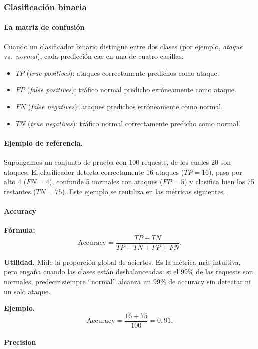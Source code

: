 \documentclass[12pt,oneside]{report}
\begin{document}
\subsubsection{Clasificación binaria}

\paragraph{La matriz de confusión}

Cuando un clasificador binario distingue entre dos clases (por ejemplo,
\emph{ataque} vs.\ \emph{normal}), cada predicción cae en una de cuatro
casillas:
\begin{itemize}[leftmargin=*]
  \item $TP$ (\emph{true positives}): ataques correctamente predichos como ataque.
  \item $FP$ (\emph{false positives}): tráfico normal predicho erróneamente como ataque.
  \item $FN$ (\emph{false negatives}): ataques predichos erróneamente como normal.
  \item $TN$ (\emph{true negatives}): tráfico normal correctamente predicho como normal.
\end{itemize}

\paragraph{Ejemplo de referencia.} Supongamos un conjunto de prueba con
100 requests, de los cuales 20 son ataques. El clasificador detecta
correctamente 16 ataques ($TP=16$), pasa por alto 4 ($FN=4$), confunde 5
normales con ataques ($FP=5$) y clasifica bien los 75 restantes
($TN=75$). Este ejemplo se reutiliza en las métricas siguientes.

\paragraph{Accuracy}

\textbf{Fórmula:}
\[
\mathrm{Accuracy}=\frac{TP+TN}{TP+TN+FP+FN}.
\]

\textbf{Utilidad.} Mide la proporción global de aciertos. Es la métrica
más intuitiva, pero engaña cuando las clases están desbalanceadas: si el
99\% de las requests son normales, predecir siempre ``normal'' alcanza
un 99\% de accuracy sin detectar ni un solo ataque.

\textbf{Ejemplo.}
\[
\mathrm{Accuracy}=\frac{16+75}{100}=0{,}91.
\]

\paragraph{Precision}
\end{document}
